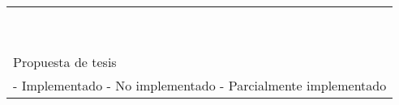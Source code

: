 \begin{table}[h|]
{\begin{tabular}{| l | p{2.5cm} | p{2.5cm} | p{2.5cm} | p{2.5cm} | p{2.5cm} | p{2.5cm} | p{2.5cm}|}
  			\citet{swingBeat} 			& \cmark & \cmark & \xmark & \xmark & \xmark & \xmark & \xmark\\
  			\citet{perceptTempo} 		& \cmark & \cmark & \cmark & \xmark & \xmark & \cmark & \xmark\\
  			\citet{tempoMP3}			& \amark & \cmark & \cmark & \cmark & \amark & \xmark & \xmark\\
  			\citet{realtimeTempo} 		& \cmark & \cmark & \xmark & \cmark & \xmark & \xmark & \xmark\\
 			\citet{autoRingtone} 			& \cmark & \cmark & \cmark & \xmark & \xmark & \xmark & \xmark\\
 			\citet{coverRec} 			& \cmark & \xmark & \xmark & \xmark & \cmark & \xmark & \xmark\\
 			\citet{segPopularMusic}  		& \cmark & \cmark & \cmark & \xmark & \xmark & \xmark & \xmark\\
 	 		\citet{tempoSearch} 			& \xmark & \cmark & \xmark & \cmark & \cmark & \cmark & \amark\\
 	 		\citet{becker2010automatic} 	& \cmark & \cmark & \xmark & \cmark & \xmark & \xmark & \amark\\
	 		\hline
	  		Propuesta de tesis 			& \cmark & \cmark & \cmark & \cmark & \amark & \cmark & \cmark\\
 	 		\hline
			\multicolumn{8}{|l|}{
  				\begin{minipage}{25cm}
    					\centering \footnotesize \greenify{\checkmark} - Implementado
					\redify{\text{\sffamily X}} - No implementado
					\bluefy{$\approx$} - Parcialmente implementado
  				\end{minipage}
			}\\
			\hline
 		\end{tabular}
  		}
	\label{table:comparativa}
	\end{table}